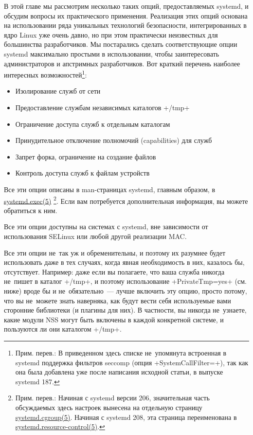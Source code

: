 \documentclass[10pt,oneside,a4paper]{article}
\begin{document}
В этой главе мы рассмотрим несколько таких опций, предоставляемых systemd, и
обсудим вопросы их практического применения. Реализация этих опций основана на
использовании ряда уникальных технологий безопасности, интегрированных в ядро
Linux уже очень давно, но при этом практически неизвестных для большинства
разработчиков. Мы постарались сделать соответствующие опции systemd максимально
простыми в использовании, чтобы заинтересовать администраторов и апстримных
разработчиков. Вот краткий перечень наиболее интересных
возможностей\footnote{Прим. перев.: В приведенном здесь списке не~упомянута
встроенная в systemd поддержка фильтров seccomp (опция +SystemCallFilter=+),
так как она была добавлена уже после написания исходной статьи, в выпуске
systemd 187.}:
\begin{itemize}
	\item Изолирование служб от сети
	\item Предоставление службам независимых каталогов +/tmp+
	\item Ограничение доступа служб к отдельным каталогам
	\item Принудительное отключение полномочий (capabilities) для служб
	\item Запрет форка, ограничение на создание файлов
	\item Контроль доступа служб к файлам устройств
\end{itemize}

Все эти опции описаны в man-страницах systemd, главным образом, в
\href{http://www.freedesktop.org/software/systemd/man/systemd.exec.html}{systemd.exec(5)}%
\footnote{Прим. перев.: Начиная с systemd версии 206, значительная часть
обсуждаемых здесь настроек вынесена на отдельную страницу
\href{http://www.freedesktop.org/software/systemd/man/systemd.cgroup.html}%
{systemd.cgroup(5)}. Начиная с systemd 208, эта страница переименована в
\href{http://www.freedesktop.org/software/systemd/man/systemd.resource-control.html}%
{systemd.resource-control(5)}.}. Если вам потребуется дополнительная информация,
вы можете обратиться к ним.

Все эти опции доступны на системах с systemd, вне зависимости от использования
SELinux или любой другой реализации MAC.

Все эти опции не~так уж и обременительны, и поэтому их разумнее будет
использовать даже в тех случаях, когда явная необходимость в них, казалось бы,
отсутствует. Например: даже если вы полагаете, что ваша служба никогда не~пишет
в каталог +/tmp+, и поэтому использование +PrivateTmp=yes+ (см. ниже) вроде бы и
не~обязательно~--- лучше включить эту опцию, просто потому, что вы не~можете
знать наверняка, как будут вести себя используемые вами сторонние библиотеки (и
плагины для них). В частности, вы никогда не~узнаете, какие модули NSS могут
быть включены в каждой конкретной системе, и пользуются ли они каталогом +/tmp+.
\end{document}
